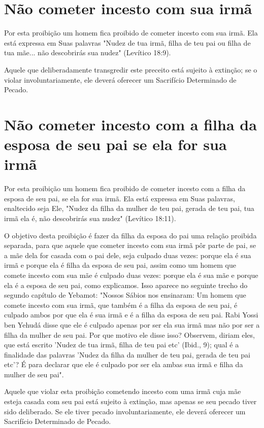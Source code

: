 \begin{itemize}
\begin{enumrate}
\begin{itemize}
\begin{itemize}
\begin{itemize}
\section{Não cometer incesto com sua irmã}

Por esta proibição um homem fica proibido de cometer incesto com sua
irmã. Ela está expressa em Suas palavras "Nudez de tua irmã, filha de
teu pai ou filha de tua mãe... não descobrirás sua nudez" (Levítico
18:9).

Aquele que deliberadamente transgredir este preceito está sujeito à
extinção; se o violar involuntariamente, ele deverá oferecer um
Sacrifício De­terminado de Pecado.

\section{Não cometer incesto com a filha da esposa de seu pai se ela for sua irmã}

Por esta proibição um homem fica proibido de cometer incesto com a filha
da esposa de seu pai, se ela for sua irmã. Ela está expressa em Suas
pala­vras, enaltecido seja Ele, "Nudez da filha da mulher de teu pai,
gerada de teu pai, tua irmã ela é, não descobrirás sua nudez" (Levítico
18:11).

O objetivo desta proibição é fazer da filha da esposa do pai uma
re­lação proibida separada, para que aquele que cometer incesto com sua
irmã pôr parte de pai, se a mãe dela for casada com o pai dele, seja
culpado duas vezes: porque ela é sua irmã e porque ela é filha da esposa
de seu pai, assim como um homem que comete incesto com sua mãe é culpado
duas vezes: porque ela é sua mãe e porque ela é a esposa de seu pai,
como explicamos. Isso aparece no seguinte trecho do segundo capítulo de
Yebamot: "Nossos Sábios nos ensi­naram: Um homem que comete incesto com
sua irmã, que também é a filha da esposa de seu pai, é culpado ambos por
que ela é sua irmã e é a filha da esposa de seu pai. Rabi Yossi ben
Yehudá disse que ele é culpado apenas por ser ela sua irmã mas não por
ser a filha da mulher de seu pai. Por que motivo ele disse isso?
Observem, diriam eles, que está escrito 'Nudez de tua irmã, filha de teu
pai etc' (Ibid., 9); qual é a finalidade das palavras 'Nudez da filha da
mu­lher de teu pai, gerada de teu pai etc'? É para declarar que ele é
culpado por ser ela ambas sua irmã e filha da mulher de seu pai".

Aquele que violar esta proibição cometendo incesto com uma irmã cuja mãe
esteja casada com seu pai está sujeito à extinção, mas apenas se seu
pecado tiver sido deliberado. Se ele tiver pecado involuntariamente, ele
deve­rá oferecer um Sacrifício Determinado de Pecado.


\end{itemize}
\end{itemize}
\end{itemize}
\end{enumrate}
\end{itemize}

